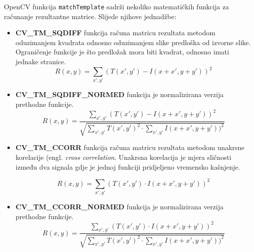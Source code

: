 OpenCV funkcija \texttt{matchTemplate} sadrži nekoliko matematičkih funkcija za
računanje rezultantne matrice. Slijede njihove jednadžbe:
\begin{itemize}
    \item \textbf{CV\_TM\_SQDIFF} funkcija računa matricu
     rezultata metodom oduzimanjem kvadrata odnosno 
     oduzimanjem slike
     predloška od izvorne slike. Ograničenje funkcije je što
     predložak mora biti kvadrat, odnosno imati jednake stranice.
    \begin{equation}
         R\left ( x,y \right )= \sum_{{x}',{y}'} (T({x}',{y}')-I\left ( x+{x}',y+{y}' \right ))^{2}
	\end{equation}

    \item \textbf{CV\_TM\_SQDIFF\_NORMED} funkcija je 
    normalizirana verzija prethodne funkcije. 
    \begin{equation}
     R\left ( x,y \right )= \frac{\sum_{{x}',{y}'}(T({x}',{y}') - I\left ( x+{x}',y+{y}' \right ))^{2}}{\sqrt{\sum_{{x}',{y}'}T({x}',{y}')^{2}\cdot \sum_{{x}',{y}'}I\left ( x+{x}',y+{y}' \right ))^{2}}}
    \end{equation}
    
    \newpage
    \item \textbf{CV\_TM\_CCORR} funkcija računa matricu rezultata
    metodom unakrsne korelacije (engl. \textit{cross correlation}. 
    Unakrsna korelacija je mjera sličnosti između dva signala gdje
    je jednoj funkciji pridjeljeno vremensko kašnjenje.
    
    \begin{equation}
     R\left ( x,y \right )= \sum_{{x}',{y}'} (T({x}',{y}')\cdot I\left ( x+{x}',y+{y}' \right ))^{2}
    \end{equation}
    
    \item \textbf{CV\_TM\_CCORR\_NORMED} funkcija je normalizirana 
    verzija prethodne funkcije.
    \begin{equation}
     R\left ( x,y \right ) = \frac{\sum_{{x}',{y}'}(T({x}',{y}')\cdot I\left ( x+{x}',y+{y}' \right ))^{2}}{\sqrt{\sum_{{x}',{y}'}T({x}',{y}')^{2}\cdot \sum_{{x}',{y}'}I\left ( x+{x}',y+{y}' \right ))^{2}}}
    \end{equation}
    

\end{itemize}
